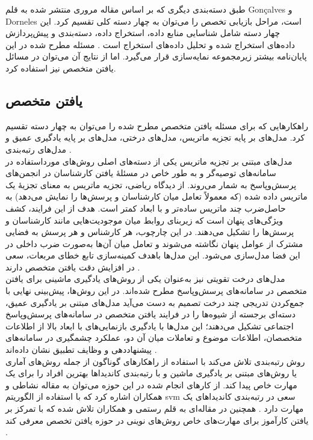 طبق دسته‌بندی دیگری که بر اساس مقاله مروری منتشر شده به قلم Gonçalves و Dorneles است، مراحل بازیابی تخصص را می‌توان به چهار دسته کلی تقسیم کرد. این چهار دسته شامل شناسایی منابع داده، استخراج داده، دسته‌بندی و پیش‌پردازش داده‌های استخراج شده و تحلیل داده‌های استخراج است \cite{goncalves_automated_2019}. مسئله مطرح شده در این پایان‌نامه بیشتر زیرمجموعه نمایه‌سازی قرار می‌گیرد. اما از نتایج آن می‌توان در مسائل یافتن متخصص نیز استفاده کرد.

\subsection{یافتن متخصص}
راهکارهایی که برای مسئله یافتن متخصص مطرح شده را می‌توان به چهار دسته تقسیم کرد. مدل‌های بر پایه تجزیه ماتریس، مدل‌های درختی، مدل‌های بر پایه یادگیری عمیق و مدل‌های رتبه‌بندی \cite{lin_survey_2017}\cite{yuan_expert_2020}. 
\\
 مدل‌های مبتنی بر تجزیه ماتریس یکی از دسته‌های اصلی روش‌های مورداستفاده در سامانه‌های توصیه‌گر و به طور خاص در مسئلهٔ یافتن کارشناسان در انجمن‌های پرسش‌وپاسخ به شمار می‌روند. از دیدگاه ریاضی، تجزیه ماتریس به معنای تجزیهٔ یک ماتریس داده شده (که معمولاً تعامل میان کارشناسان و پرسش‌ها را نمایش می‌دهد) به حاصل‌ضرب چند ماتریس ساده‌تر و با ابعاد کمتر است. هدف از این فرایند، کشف ویژگی‌های پنهان است که زیربنای روابط میان موجودیت‌هایی مانند کارشناسان و پرسش‌ها را تشکیل می‌دهند. در این چارچوب، هر کارشناس و هر پرسش به فضایی مشترک از عوامل پنهان نگاشته می‌شوند و تعامل میان آن‌ها به‌صورت ضرب داخلی در این فضا مدل‌سازی می‌شود. این مدل‌ها باهدف کمینه‌سازی تابع خطای مربعات، سعی در افزایش دقت یافتن متخصص دارند \cite{10.1109/ICDM.2010.127}\cite{hofmann_contextual_2010}\cite{koren_factorization_2008}\cite{chen_bayesian_2021}.
\\
 مدل‌های درخت تقویتی نیز به‌عنوان یکی از روش‌های یادگیری ماشینی برای یافتن متخصص در سامانه‌های پرسش‌وپاسخ مطرح شده‌اند. در این روش‌ها، پیش‌بینی نهایی با جمع‌کردن تدریجی چند درخت تصمیم به دست می‌آید مدل‌های مبتنی بر یادگیری عمیق، دسته‌ای برجسته از شیوه‌ها را در فرایند یافتن متخصص در سامانه‌های پرسش‌وپاسخ اجتماعی تشکیل می‌دهند؛ این مدل‌ها با یادگیری بازنمایی‌های با ابعاد بالا از اطلاعات متخصصان، اطلاعات موضوع و تعاملات میان آن دو، عملکرد چشمگیری در سامانه‌های پیشنهاددهی و وظایف تطبیق نشان داده‌اند  \cite{yuan_expert_2020}. 
\\
 روش رتبه‌بندی تلاش می‌کند با استفاده از راهکارهای گوناگون از جمله روش‌های آماری یا روش‌های مبتنی بر یادگیری ماشین و با رتبه‌بندی کاندیداها بهترین افراد را برای یک مهارت خاص پیدا کند\cite{lin_survey_2017}. از کارهای انجام شده در این حوزه می‌توان به مقاله نشاطی و همکاران اشاره کرد که با استفاده از الگوریتم svm سعی در رتبه‌بندی کاندیداهای یک مهارت دارد \cite{neshati_dynamicity_2017}. همچنین در مقاله‌ای به قلم رستمی و همکاران تلاش شده که با تمرکز بر یافتن کارآموز برای مهارت‌های خاص روش‌های نوینی در حوزه یافتن تخصص معرفی کند \cite{rostami_intern_2021}. 
